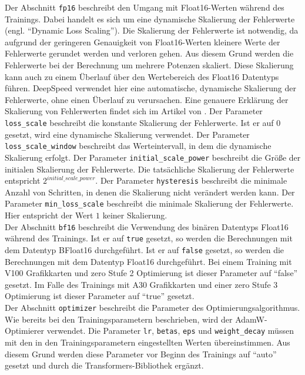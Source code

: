 Der Abschnitt \texttt{fp16} beschreibt den Umgang mit Float16-Werten während des Trainings.
Dabei handelt es sich um eine dynamische Skalierung der Fehlerwerte (engl. \enquote{Dynamic Loss Scaling}).
Die Skalierung der Fehlerwerte ist notwendig, da aufgrund der geringeren Genauigkeit von Float16-Werten kleinere Werte der Fehlerwerte gerundet werden und verloren gehen.
Aus diesem Grund werden die Fehlerwerte bei der Berechnung um mehrere Potenzen skaliert.
Diese Skalierung kann auch zu einem Überlauf über den Wertebereich des Float16 Datentyps führen.
DeepSpeed verwendet hier eine automatische, dynamische Skalierung der Fehlerwerte, ohne einen Überlauf zu verursachen.
Eine genauere Erklärung der Skalierung von Fehlerwerten findet sich im Artikel von \citet{lossscale}.
Der Parameter \texttt{loss\_scale} beschreibt die konstante Skalierung der Fehlerwerte.
Ist er auf $0$ gesetzt, wird eine dynamische Skalierung verwendet.
Der Parameter \texttt{loss\_scale\_window} beschreibt das Werteintervall, in dem die dynamische Skalierung erfolgt.
Der Parameter \texttt{initial\_scale\_power} beschreibt die Größe der initialen Skalierung der Fehlerwerte.
Die tatsächliche Skalierung der Fehlerwerte entspricht $2^{initial\_scale\_power}$.
Der Parameter \texttt{hysteresis} beschreibt die minimale Anzahl von Schritten, in denen die Skalierung nicht verändert werden kann.
Der Parameter \texttt{min\_loss\_scale} beschreibt die minimale Skalierung der Fehlerwerte.
Hier entspricht der Wert $1$ keiner Skalierung.\\

Der Abschnitt \texttt{bf16} beschreibt die Verwendung des binären Datentyps Float16 während des Trainings.
Ist er auf \texttt{true} gesetzt, so werden die Berechnungen mit dem Datentyp BFloat16 durchgeführt.
Ist er auf \texttt{false} gesetzt, so werden die Berechnungen mit dem Datentyp Float16 durchgeführt.
Bei einem Training mit V100 Grafikkarten und \ac{zero} Stufe 2 Optimierung ist dieser Parameter auf \enquote{false} gesetzt.
Im Falle des Trainings mit A30 Grafikkarten und einer \ac{zero} Stufe 3 Optimierung ist dieser Parameter auf \enquote{true} gesetzt.\\

Der Abschnitt \texttt{optimizer} beschreibt die Parameter des Optimierungsalgorithmus. Wie bereits bei den Trainingsparametern beschrieben, wird der AdamW-Optimierer verwendet.
Die Parameter \texttt{lr}, \texttt{betas}, \texttt{eps} und \texttt{weight\_decay} müssen mit den in den Trainingsparametern eingestellten Werten übereinstimmen.
Aus diesem Grund werden diese Parameter vor Beginn des Trainings auf \enquote{auto} gesetzt und durch die Transformers-Bibliothek ergänzt.\\

